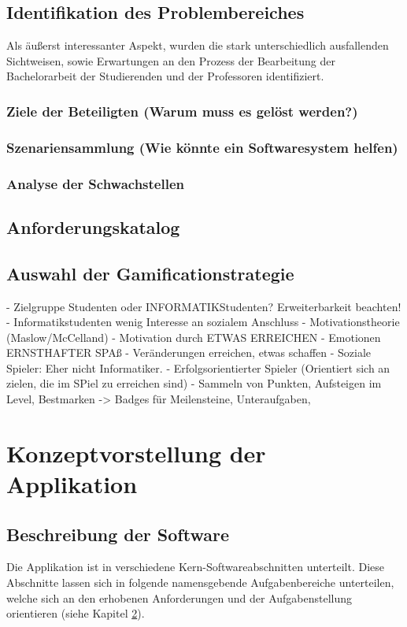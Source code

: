 \documentclass{scrreprt}
\begin{document}
\section{Identifikation des Problembereiches}
Als äußerst interessanter Aspekt, wurden die stark unterschiedlich ausfallenden Sichtweisen, sowie Erwartungen an den Prozess der Bearbeitung der Bachelorarbeit der Studierenden und der Professoren identifiziert.

\subsection{Ziele der Beteiligten (Warum muss es gelöst werden?)}
\subsection{Szenariensammlung (Wie könnte ein Softwaresystem helfen)}
\subsection{Analyse der Schwachstellen}

\section{Anforderungskatalog}\label{sec:anforderungskatalog}

\section{Auswahl der Gamificationstrategie}
- Zielgruppe Studenten oder INFORMATIKStudenten? Erweiterbarkeit beachten!
- Informatikstudenten wenig Interesse an sozialem Anschluss
- Motivationstheorie (Maslow/McCelland) 
- Motivation durch ETWAS ERREICHEN
- Emotionen ERNSTHAFTER SPAß - Veränderungen erreichen, etwas schaffen
- Soziale Spieler: Eher nicht Informatiker. 
- Erfolgsorientierter Spieler (Orientiert sich an zielen, die im SPiel zu erreichen sind)
- Sammeln von Punkten, Aufsteigen im Level, Bestmarken
-> Badges für Meilensteine, Unteraufgaben, 


\chapter{Konzeptvorstellung der Applikation}

\section{Beschreibung der Software}
\par Die Applikation ist in verschiedene Kern-Softwareabschnitten unterteilt. Diese Abschnitte lassen sich in folgende namensgebende Aufgabenbereiche unterteilen, welche sich an den erhobenen Anforderungen und der Aufgabenstellung orientieren (siehe Kapitel \ref{sec:anforderungskatalog}).\\
\end{document}
